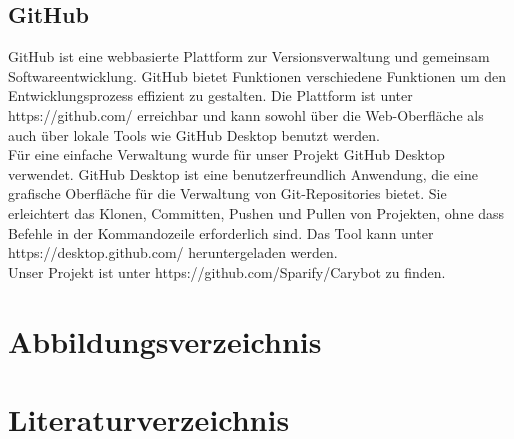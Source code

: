 \documentclass[ngerman,12pt,a4paper]{article}
\begin{document}
	 \subsection{GitHub}
	 GitHub ist eine webbasierte Plattform zur Versionsverwaltung und gemeinsam Softwareentwicklung. GitHub bietet Funktionen verschiedene Funktionen um den Entwicklungsprozess effizient zu gestalten. Die Plattform ist unter https://github.com/ erreichbar und kann sowohl über die Web-Oberfläche als auch über lokale Tools wie GitHub Desktop benutzt werden. \\[0.5cm]
	 Für eine einfache Verwaltung wurde für unser Projekt GitHub Desktop verwendet. GitHub Desktop ist eine benutzerfreundlich Anwendung, die eine grafische Oberfläche für die Verwaltung von Git-Repositories bietet. Sie erleichtert das Klonen, Committen, Pushen und Pullen von Projekten, ohne dass Befehle in der Kommandozeile erforderlich sind. Das Tool kann unter https://desktop.github.com/ heruntergeladen werden.\\[0.5cm]
	 Unser Projekt ist unter https://github.com/Sparify/Carybot zu finden.
	 
\newpage
	\fancyfoot[L]{}
	\section{Abbildungsverzeichnis}
	
		\listoffigures
\newpage
	\section{Literaturverzeichnis}
		\listoffootnotes
 
	 
\end{document}

